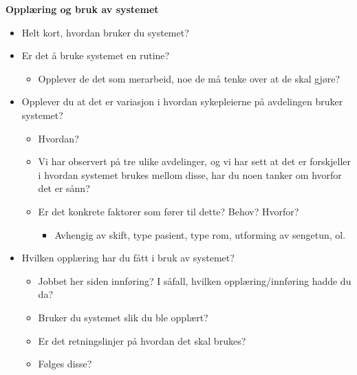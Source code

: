 \noindent
\textbf{Opplæring og bruk av systemet}
\begin{itemize}
	\item Helt kort, hvordan bruker du systemet?
	\item Er det å bruke systemet en rutine?
	\begin{itemize}
		\item Opplever de det som merarbeid, noe de må tenke over at de skal gjøre?
	\end{itemize}	  
	\item Opplever du at det er variasjon i hvordan sykepleierne på avdelingen bruker systemet?
	\begin{itemize}
		\item Hvordan?
		\item Vi har observert på tre ulike avdelinger, og vi har sett at det er forskjeller i hvordan systemet brukes mellom disse, har du noen tanker om hvorfor det er sånn?
		\item Er det konkrete faktorer som fører til dette? Behov? Hvorfor?   	
		\begin{itemize}
			\item Avhengig av skift, type pasient, type rom, utforming av sengetun, ol.
		\end{itemize}		 
	\end{itemize}
	\item Hvilken opplæring har du fått i bruk av systemet? 
		\begin{itemize}
			\item Jobbet her siden innføring? I såfall, hvilken opplæring/innføring hadde du da?
			\item Bruker du systemet slik du ble opplært?
			\item Er det retningslinjer på hvordan det skal brukes?
			\item Følges disse?
		\end{itemize}
\end{itemize}

